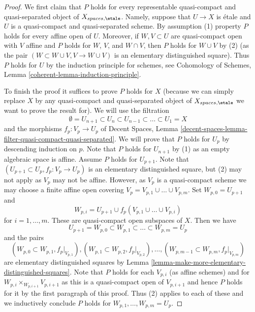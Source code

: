 \begin{proof}
We first claim that $P$ holds for every representable
quasi-compact and quasi-separated object of $X_{spaces, \etale}$.
Namely, suppose that $U \to X$ is \'etale and $U$ is a
quasi-compact and quasi-separated scheme. By assumption (1)
property $P$ holds for every affine open of $U$. Moreover, if
$W, V \subset U$ are quasi-compact open with $V$ affine and $P$ holds for 
$W$, $V$, and $W \cap V$, then $P$ holds for $W \cup V$ by (2)
(as the pair $(W \subset W \cup V, V \to W \cup V)$ is an elementary
distinguished square). Thus $P$ holds for $U$ by the induction
principle for schemes, see
Cohomology of Schemes, Lemma \ref{coherent-lemma-induction-principle}.

\medskip\noindent
To finish the proof it suffices to prove $P$ holds for $X$
(because we can simply replace $X$ by any quasi-compact and quasi-separated
object of $X_{spaces, \etale}$ we want to prove the result for).
We will use the filtration
$$
\emptyset = U_{n + 1} \subset
U_n \subset U_{n - 1} \subset \ldots \subset U_1 = X
$$
and the morphisms $f_p : V_p \to U_p$ of
Decent Spaces, Lemma
\ref{decent-spaces-lemma-filter-quasi-compact-quasi-separated}.
We will prove that $P$ holds for $U_p$ by descending induction on $p$.
Note that $P$ holds for $U_{n + 1}$ by (1)
as an empty algebraic space is affine. Assume $P$ holds for $U_{p + 1}$.
Note that $(U_{p + 1} \subset U_p, f_p : V_p \to U_p)$ is an elementary
distinguished square, but (2) may not apply as $V_p$ may not be affine.
However, as $V_p$ is a quasi-compact scheme we may choose a finite affine open
covering $V_p = V_{p, 1} \cup \ldots \cup V_{p, m}$.
Set $W_{p, 0} = U_{p + 1}$ and
$$
W_{p, i} = U_{p + 1} \cup f_p(V_{p, 1} \cup \ldots \cup V_{p, i})
$$
for $i = 1, \ldots, m$. These are quasi-compact open subspaces of $X$.
Then we have
$$
U_{p + 1} = W_{p, 0} \subset
W_{p, 1} \subset \ldots \subset
W_{p, m} = U_p
$$
and the pairs
$$
(W_{p, 0} \subset W_{p, 1}, f_p|_{V_{p, 1}}),
(W_{p, 1} \subset W_{p, 2}, f_p|_{V_{p, 2}}),\ldots,
(W_{p, m - 1} \subset W_{p, m}, f_p|_{V_{p, m}})
$$
are elementary distinguished squares by
Lemma \ref{lemma-make-more-elementary-distinguished-squares}.
Note that $P$ holds for each $V_{p, i}$ (as affine schemes) and for
$W_{p, i} \times_{W_{p, i + 1}} V_{p, i + 1}$ as this is a quasi-compact
open of $V_{p, i + 1}$ and hence $P$ holds for it by the first paragraph
of this proof. Thus (2) applies to each of these and we inductively
conclude $P$ holds for $W_{p, 1}, \ldots, W_{p, m} = U_p$.
\end{proof}

